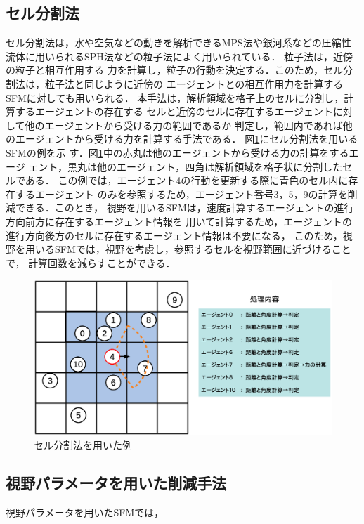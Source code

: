\subsection{セル分割法}
セル分割法は，水や空気などの動きを解析できるMPS法\cite{mps}や銀河系などの圧縮性
流体に用いられるSPH法\cite{sph}などの粒子法によく用いられている．
粒子法は，近傍の粒子と相互作用する
力を計算し，粒子の行動を決定する．このため，セル分割法は，粒子法と同じように近傍の
エージェントとの相互作用力を計算するSFMに対しても用いられる．
本手法は，解析領域を格子上のセルに分割し，計算するエージェントの存在する
セルと近傍のセルに存在するエージェントに対して他のエージェントから受ける力の範囲であるか
判定し，範囲内であれば他のエージェントから受ける力を計算する手法である．
図\ref{fig:seru_ex1}にセル分割法を用いるSFMの例を示
す．図\ref{fig:seru_ex1}中の赤丸は他のエージェントから受ける力の計算をするエージ
ェント，黒丸は他のエージェント，四角は解析領域を格子状に分割したセルである．
この例では，エージェント4の行動を更新する際に青色のセル内に存在するエージェント
のみを参照するため，エージェント番号3，5，9の計算を削減できる．このとき，
視野を用いるSFMは，速度計算するエージェントの進行方向前方に存在するエージェント情報を
用いて計算するため，エージェントの進行方向後方のセルに存在するエージェント情報は不要になる，
このため，視野を用いるSFMでは，視野を考慮し，参照するセルを視野範囲に近づけることで，
計算回数を減らすことができる．

\begin{figure}[hbtp]
 \begin{center}
  \includegraphics[width=11.5cm,clip]{figure/seru_ex1_r2.eps}
  \caption{セル分割法を用いた例}
  \label{fig:seru_ex1}
 \end{center}
\end{figure}


\subsection{視野パラメータを用いた削減手法}
視野パラメータを用いたSFMでは，


